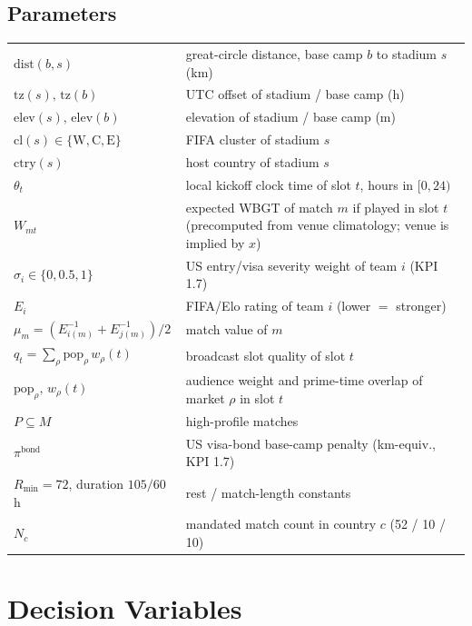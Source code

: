 \documentclass[12pt, letterpaper]{article}
\begin{document}
\subsection*{Parameters}
\begin{tabular}{@{}lp{11.2cm}@{}}
\toprule
$\mathrm{dist}(b,s)$ & great-circle distance, base camp $b$ to stadium
                       $s$ (km) \\
$\mathrm{tz}(s),\,\mathrm{tz}(b)$ & UTC offset of stadium / base camp (h) \\
$\mathrm{elev}(s),\,\mathrm{elev}(b)$ & elevation of stadium / base camp (m) \\
$\mathrm{cl}(s)\in\{\mathrm{W,C,E}\}$ & FIFA cluster of stadium $s$ \\
$\mathrm{ctry}(s)$ & host country of stadium $s$ \\
$\theta_t$ & local kickoff clock time of slot $t$, hours in $[0,24)$ \\
$W_{mt}$ & expected WBGT of match $m$ if played in slot $t$
           (precomputed from venue climatology; venue is implied by $x$) \\
$\sigma_i\in\{0,0.5,1\}$ & US entry/visa severity weight of team $i$
                           (KPI 1.7) \\
$E_i$ & FIFA/Elo rating of team $i$ (lower $=$ stronger) \\
$\mu_m=(E_{i(m)}^{-1}+E_{j(m)}^{-1})/2$ & match value of $m$ \\
$q_t=\sum_{\rho}\mathrm{pop}_\rho\,w_\rho(t)$ & broadcast slot quality of
                       slot $t$ \\
$\mathrm{pop}_\rho,\,w_\rho(t)$ & audience weight and prime-time overlap
                       of market $\rho$ in slot $t$ \\
$P\subseteq M$ & high-profile matches \\
$\pi^{\mathrm{bond}}$ & US visa-bond base-camp penalty (km-equiv., KPI 1.7) \\
$R_{\min}=72$, duration $105/60$ h & rest / match-length constants \\
$N_c$ & mandated match count in country $c$ (52 / 10 / 10) \\
\bottomrule
\end{tabular}

\section{Decision Variables}
\end{document}
